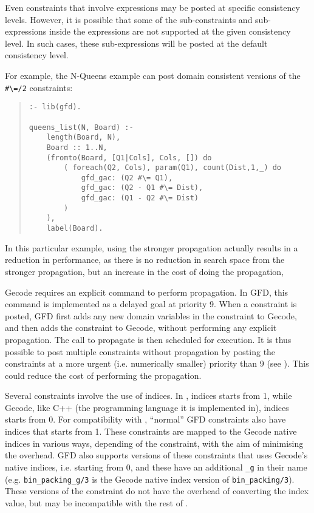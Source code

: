 Even constraints that involve expressions may be posted at specific 
consistency levels. However, it is possible that some of
the sub-constraints and sub-expressions inside the expressions are not supported
at the given consistency level. In such cases, these sub-expressions will be
posted at the default consistency level.

For example, the N-Queens example
can post domain consistent versions of the \verb'#\=/2' constraints:
\begin{quote}
\begin{verbatim}
:- lib(gfd).

queens_list(N, Board) :-
    length(Board, N),
    Board :: 1..N,
    (fromto(Board, [Q1|Cols], Cols, []) do
        ( foreach(Q2, Cols), param(Q1), count(Dist,1,_) do
            gfd_gac: (Q2 #\= Q1),
            gfd_gac: (Q2 - Q1 #\= Dist),
            gfd_gac: (Q1 - Q2 #\= Dist)
        )
    ),
    label(Board).
\end{verbatim}
\end{quote}
In this particular example, using the stronger propagation actually results in
a reduction in performance, as there is no reduction in search space from the
stronger propagation, but an increase in the cost of doing the propagation, 


Gecode requires an explicit command to perform propagation. In GFD,
this command is implemented as a delayed goal at priority 9.
When a constraint is posted, GFD first adds any new domain variables in
 the constraint to Gecode, and then adds the constraint to Gecode,
 without performing any explicit propagation. The call to propagate is
then scheduled for execution. It is thus possible to post multiple
 constraints without propagation by posting the constraints at a more
urgent (i.e. numerically smaller) priority than 9 (see
).
This could reduce the cost of performing the propagation.
 
Several constraints involve the use of indices. In \eclipse, indices starts
from 1, while Gecode, like C++ (the programming language it is implemented in), indices starts from 0. For compatibility 
with \eclipse, ``normal'' GFD constraints also have indices
that starts from 1. These constraints are mapped to the Gecode native 
indices in various ways, depending of the constraint, with the aim of 
minimising the overhead. GFD also supports versions of these constraints that 
uses Gecode's native indices, i.e. starting from 0, and these have an 
additional {\tt _g} in their name (e.g. {\tt bin_packing_g/3} is the Gecode native
index version of {\tt bin_packing/3}). These versions of the constraint do not
have the overhead of converting the index value, but may be
incompatible with the rest of \eclipse.


